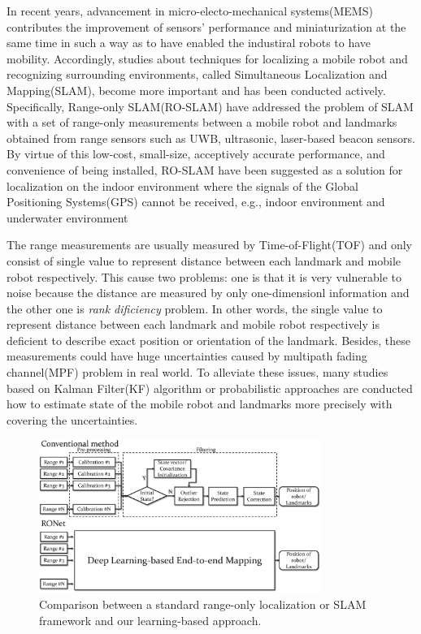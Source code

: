 \documentclass[letterpaper, 10 pt, conference]{ieeeconf}  %
\begin{document}
 In recent years, advancement in micro-electo-mechanical systems(MEMS) contributes the improvement of sensors' performance and miniaturization at the same time in such a way as to have enabled the industiral robots to have mobility. Accordingly, studies about techniques for localizing a mobile robot and recognizing surrounding environments, called Simultaneous Localization and Mapping(SLAM)\cite{dissanayake2001solution}, become more important and has been conducted actively. Specifically, Range-only SLAM(RO-SLAM) have addressed the problem of SLAM with a set of range-only measurements between a mobile robot and landmarks obtained from range sensors such as UWB, ultrasonic, laser-based beacon sensors. By virtue of this low-cost, small-size, acceptively accurate performance, and convenience of being installed, RO-SLAM have been suggested as a solution for localization on the indoor environment\cite{peneda2009trilateration, jung2011indoor} where the signals of the Global Positioning Systems(GPS) cannot be received, e.g., indoor environment\cite{peneda2009trilateration, jung2011indoor,raghavan2010accurate} and underwater environment\cite{newman2003pure, olson2006robust}
 
 
 The range measurements are usually measured by Time-of-Flight(TOF) and only consist of single value to represent distance between each landmark and mobile robot respectively. This cause two problems: one is that it is very vulnerable to noise because the distance are measured by only one-dimensionl information and the other one is \textit{rank dificiency} problem\cite{fabresse2018efficient}. In other words, the single value to represent distance between each landmark and mobile robot respectively is deficient to describe exact position or orientation of the landmark. Besides, these measurements could have huge uncertainties caused by multipath fading channel(MPF) problem\cite{li2017novel} in real world. To alleviate these issues, many studies based on Kalman Filter(KF) algorithm or probabilistic approaches are conducted how to estimate state of the mobile robot and landmarks more precisely with covering the uncertainties. 

\begin{figure}[h]
	
	\centering
	\includegraphics[height=5cm]{image/conventional_deep_comparsion}
	
	\label{fig:example}
	
	\caption{Comparison between a standard range-only localization or SLAM framework and our learning-based approach.}
	
\end{figure}
\end{document}
